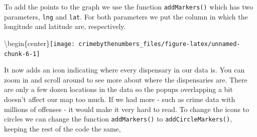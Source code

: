 \documentclass[
]{krantz}
\makeatletter
\newenvironment{Shaded}{\begin{snugshade}}{\end{snugshade}}
\newcommand{\AttributeTok}[1]{\textcolor[rgb]{0.61,0.61,0.61}{#1}}
\newcommand{\FunctionTok}[1]{\textcolor[rgb]{0,0,0}{#1}}
\newcommand{\NormalTok}[1]{#1}
\newcommand{\SpecialCharTok}[1]{\textcolor[rgb]{0,0,0}{#1}}
\newcommand{\StringTok}[1]{\textcolor[rgb]{0.5,0.5,0.5}{#1}}
\newenvironment{kframe}{%
\medskip{}
\setlength{\fboxsep}{.8em}
 \def\at@end@of@kframe{}%
 \ifinner\ifhmode%
  \def\at@end@of@kframe{\end{minipage}}%
  \begin{minipage}{\columnwidth}%
 \fi\fi%
 \def\FrameCommand##1{\hskip\@totalleftmargin \hskip-\fboxsep
 \colorbox{shadecolor}{##1}\hskip-\fboxsep
     \hskip-\linewidth \hskip-\@totalleftmargin \hskip\columnwidth}%
 \MakeFramed {\advance\hsize-\width
   \@totalleftmargin\z@ \linewidth\hsize
   \@setminipage}}%
 {\par\unskip\endMakeFramed%
 \at@end@of@kframe}
\renewenvironment{Shaded}{\begin{kframe}}{\end{kframe}}
\makeatother
\begin{document}
To add the points to the graph we use the function \texttt{addMarkers()} which has two parameters, \texttt{lng} and \texttt{lat}. For both parameters we put the column in which the longitude and latitude are, respectively.

\begin{Shaded}
\end{Shaded}

\textbackslash begin\{center\}\texttt{[image: crimebythenumbers\_files/figure-latex/unnamed-chunk-6-1]}

It now adds an icon indicating where every dispensary in our data is. You can zoom in and scroll around to see more about where the dispensaries are. There are only a few dozen locations in the data so the popups overlapping a bit doesn't affect our map too much. If we had more - such as crime data with millions of offenses - it would make it very hard to read. To change the icons to circles we can change the function \texttt{addMarkers()} to \texttt{addCircleMarkers()}, keeping the rest of the code the same,

\begin{Shaded}
\end{Shaded}
\end{document}
